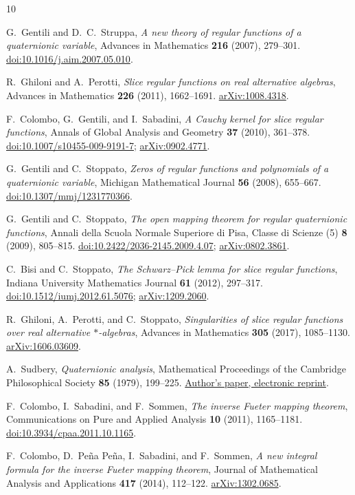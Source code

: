 \documentclass[11pt,a4paper]{article}
\numberwithin{equation}{section}
\theoremstyle{definition}
\theoremstyle{remark}
\begin{document}
\begin{thebibliography}{10}

G.~Gentili and D.~C.~Struppa,
\emph{A new theory of regular functions of a quaternionic variable},
Advances in Mathematics \textbf{216} (2007), 279--301.
\href{https://doi.org/10.1016/j.aim.2007.05.010}{doi:10.1016/j.aim.2007.05.010}.

R.~Ghiloni and A.~Perotti,
\emph{Slice regular functions on real alternative algebras},
Advances in Mathematics \textbf{226} (2011), 1662--1691.
\href{https://arxiv.org/abs/1008.4318}{arXiv:1008.4318}.

F.~Colombo, G.~Gentili, and I.~Sabadini,
\emph{A Cauchy kernel for slice regular functions},
Annals of Global Analysis and Geometry \textbf{37} (2010), 361--378.
\href{https://doi.org/10.1007/s10455-009-9191-7}{doi:10.1007/s10455-009-9191-7};
\href{https://arxiv.org/abs/0902.4771}{arXiv:0902.4771}.

G.~Gentili and C.~Stoppato,
\emph{Zeros of regular functions and polynomials of a quaternionic variable},
Michigan Mathematical Journal \textbf{56} (2008), 655--667.
\href{https://doi.org/10.1307/mmj/1231770366}{doi:10.1307/mmj/1231770366}.

G.~Gentili and C.~Stoppato,
\emph{The open mapping theorem for regular quaternionic functions},
Annali della Scuola Normale Superiore di Pisa, Classe di Scienze (5)
\textbf{8} (2009), 805--815.
\href{https://doi.org/10.2422/2036-2145.2009.4.07}{doi:10.2422/2036-2145.2009.4.07};
\href{https://arxiv.org/abs/0802.3861}{arXiv:0802.3861}.

C.~Bisi and C.~Stoppato,
\emph{The Schwarz--Pick lemma for slice regular functions},
Indiana University Mathematics Journal \textbf{61} (2012), 297--317.
\href{https://doi.org/10.1512/iumj.2012.61.5076}{doi:10.1512/iumj.2012.61.5076};
\href{https://arxiv.org/abs/1209.2060}{arXiv:1209.2060}.

R.~Ghiloni, A.~Perotti, and C.~Stoppato,
\emph{Singularities of slice regular functions over real alternative
$*$-algebras},
Advances in Mathematics \textbf{305} (2017), 1085--1130.
\href{https://arxiv.org/abs/1606.03609}{arXiv:1606.03609}.

A.~Sudbery,
\emph{Quaternionic analysis},
Mathematical Proceedings of the Cambridge Philosophical Society
\textbf{85} (1979), 199--225.
\href{https://dougsweetser.github.io/Q/Stuff/pdfs/Quaternionic-analysis.pdf}{Author's paper, electronic reprint}.

F.~Colombo, I.~Sabadini, and F.~Sommen,
\emph{The inverse Fueter mapping theorem},
Communications on Pure and Applied Analysis \textbf{10} (2011), 1165--1181.
\href{https://doi.org/10.3934/cpaa.2011.10.1165}{doi:10.3934/cpaa.2011.10.1165}.

F.~Colombo, D.~Pe\~na Pe\~na, I.~Sabadini, and F.~Sommen,
\emph{A new integral formula for the inverse Fueter mapping theorem},
Journal of Mathematical Analysis and Applications \textbf{417} (2014),
112--122.
\href{https://arxiv.org/abs/1302.0685}{arXiv:1302.0685}.

\end{thebibliography}
\end{document}
